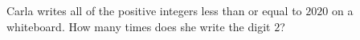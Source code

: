 Carla writes all of the positive integers less than or equal to $2020$ on a whiteboard. How many times does she write the digit $2$?

